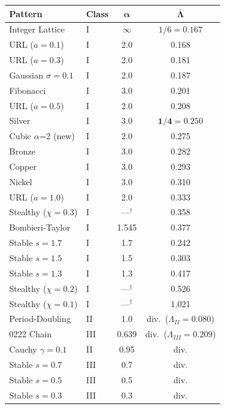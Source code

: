 \documentclass[11pt,letterpaper]{article}
\begin{document}
\noindent\begin{tabular}{llcc}
\toprule
\textbf{Pattern} & \textbf{Class} & $\boldsymbol\alpha$ & $\boldsymbol{\bar\Lambda}$ \\
\midrule
\rowcolor{resultbg}
Integer Lattice             & I & $\infty$ & $1/6 = 0.167$ \\
URL ($a = 0.1$)             & I & 2.0 & 0.168 \\
URL ($a = 0.3$)             & I & 2.0 & 0.181 \\
Gaussian $\sigma=0.1$       & I & 2.0 & 0.187 \\
Fibonacci                   & I & 3.0 & 0.201 \\
URL ($a = 0.5$)             & I & 2.0 & 0.208 \\
\rowcolor{resultbg}
Silver                      & I & 3.0 & $\mathbf{1/4} = 0.250$ \\
\rowcolor{newbg}
Cubic $\alpha$=2 (new)      & I & 2.0 & 0.275 \\
Bronze                      & I & 3.0 & 0.282 \\
Copper                      & I & 3.0 & 0.293 \\
Nickel                      & I & 3.0 & 0.310 \\
URL ($a = 1.0$)             & I & 2.0 & 0.333 \\
Stealthy ($\chi = 0.3$)     & I & ---$^\dagger$ & 0.358 \\
\rowcolor{resultbg}
Bombieri-Taylor             & I & 1.545 & 0.377 \\
Stable $s=1.7$              & I & 1.7  & 0.242 \\
Stable $s=1.5$              & I & 1.5  & 0.303 \\
Stable $s=1.3$              & I & 1.3  & 0.417 \\
Stealthy ($\chi = 0.2$)     & I & ---$^\dagger$ & 0.526 \\
Stealthy ($\chi = 0.1$)     & I & ---$^\dagger$ & 1.021 \\
\midrule
Period-Doubling             & II  & 1.0  & div.\ ($\Lambda_{II} = 0.080$) \\
\midrule
0222 Chain                  & III & 0.639& div.\ ($\Lambda_{III} = 0.209$) \\
Cauchy $\gamma=0.1$         & II  & 0.95 & div. \\
Stable $s=0.7$              & III & 0.7  & div. \\
Stable $s=0.5$              & III & 0.5  & div. \\
Stable $s=0.3$              & III & 0.3  & div. \\
\bottomrule
\end{tabular}
\end{document}
